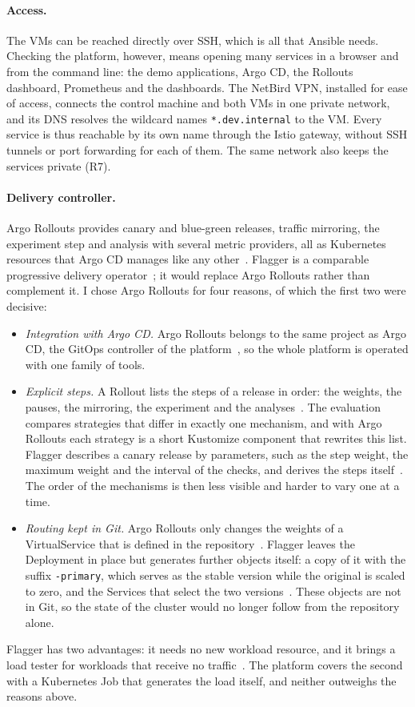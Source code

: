 \paragraph{Access.} The VMs can be reached directly over SSH, which is all that Ansible needs. Checking the platform, however, means opening many services in a browser and from the command line: the demo applications, Argo CD, the Rollouts dashboard, Prometheus and the dashboards. The NetBird VPN, installed for ease of access, connects the control machine and both VMs in one private network, and its DNS resolves the wildcard names \texttt{*.dev.internal} to the VM. Every service is thus reachable by its own name through the Istio gateway, without SSH tunnels or port forwarding for each of them. The same network also keeps the services private (R7).

\paragraph{Delivery controller.} Argo Rollouts provides canary and blue-green releases, traffic mirroring, the experiment step and analysis with several metric providers, all as Kubernetes resources that Argo CD manages like any other~\cite{ArgoRollouts}. Flagger is a comparable progressive delivery operator~\cite{Flagger}; it would replace Argo Rollouts rather than complement it. I chose Argo Rollouts for four reasons, of which the first two were decisive:
\begin{itemize}
	\item \emph{Integration with Argo CD.} Argo Rollouts belongs to the same project as Argo CD, the GitOps controller of the platform~\cite{ArgoCD}, so the whole platform is operated with one family of tools.
	\item \emph{Explicit steps.} A Rollout lists the steps of a release in order: the weights, the pauses, the mirroring, the experiment and the analyses~\cite{ArgoRolloutsCanary}. The evaluation compares strategies that differ in exactly one mechanism, and with Argo Rollouts each strategy is a short Kustomize component that rewrites this list. Flagger describes a canary release by parameters, such as the step weight, the maximum weight and the interval of the checks, and derives the steps itself~\cite{FlaggerStrategies}. The order of the mechanisms is then less visible and harder to vary one at a time.
	\item \emph{Routing kept in Git.} Argo Rollouts only changes the weights of a VirtualService that is defined in the repository~\cite{ArgoRolloutsIstio}. Flagger leaves the Deployment in place but generates further objects itself: a copy of it with the suffix \texttt{-primary}, which serves as the stable version while the original is scaled to zero, and the Services that select the two versions~\cite{FlaggerHowItWorks}. These objects are not in Git, so the state of the cluster would no longer follow from the repository alone.
\end{itemize}
Flagger has two advantages: it needs no new workload resource, and it brings a load tester for workloads that receive no traffic~\cite{FlaggerWebhooks}. The platform covers the second with a Kubernetes Job that generates the load itself, and neither outweighs the reasons above.

